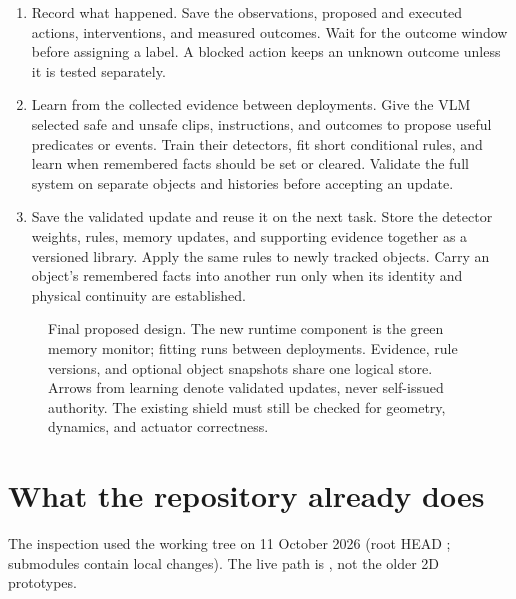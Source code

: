 \documentclass[10pt]{article}
\newcommand{\code}[1]{\texttt{\detokenize{#1}}}
\begin{document}
\begin{enumerate}[itemsep=6pt]
\item Record what happened. Save the observations, proposed and executed actions, interventions, and measured outcomes. Wait for the outcome window before assigning a label. A blocked action keeps an unknown outcome unless it is tested separately.

\item Learn from the collected evidence between deployments. Give the VLM selected safe and unsafe clips, instructions, and outcomes to propose useful predicates or events. Train their detectors, fit short conditional rules, and learn when remembered facts should be set or cleared. Validate the full system on separate objects and histories before accepting an update.

\item Save the validated update and reuse it on the next task. Store the detector weights, rules, memory updates, and supporting evidence together as a versioned library. Apply the same rules to newly tracked objects. Carry an object's remembered facts into another run only when its identity and physical continuity are established.
\end{enumerate}

\begin{figure}[ht]
\centering
\resizebox{\linewidth}{!}{}
\caption{Final proposed design. The new runtime component is the green memory monitor; fitting runs between deployments. Evidence, rule versions, and optional object snapshots share one logical store. Arrows from learning denote validated updates, never self-issued authority. The existing shield must still be checked for geometry, dynamics, and actuator correctness.}
\label{fig:system}
\end{figure}

\section{What the repository already does}
The inspection used the working tree on 11 October 2026 (root HEAD \code{75ca90d4}; submodules contain local changes). The live path is \code{fol_safety_filter/}, not the older 2D prototypes.
\end{document}
